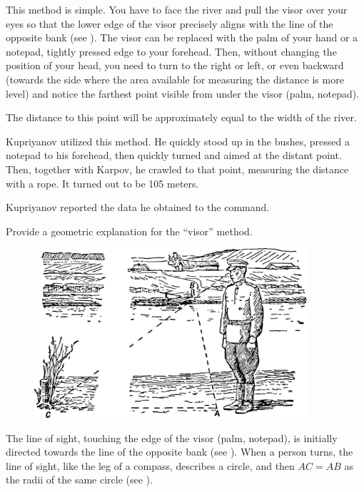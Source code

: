 This method is simple. You have to face the river and pull the visor over your eyes so that the lower edge of the visor precisely aligns with the line of the opposite bank (see ). The visor can be replaced with the palm of your hand or a notepad, tightly pressed edge to your forehead. Then, without changing the position of your head, you need to turn to the right or left, or even backward (towards the side where the area available for measuring the distance is more level) and notice the farthest point visible from under the visor (palm, notepad).

The distance to this point will be approximately equal to the width of the river.

Kupriyanov utilized this method. He quickly stood up in the bushes, pressed a notepad to his forehead, then quickly turned and aimed at the distant point. Then, together with Karpov, he crawled to that point, measuring the distance with a rope. It turned out to be 105 meters.

Kupriyanov reported the data he obtained to the command.

\ques Provide a geometric explanation for the ``visor'' method.

\begin{figure}[h!]
\centering
\includegraphics[width=0.9\textwidth]{figures/ch-02/fig-033.pdf}
\end{figure}

\ans The line of sight, touching the edge of the visor (palm, notepad), is initially directed towards the line of the opposite bank (see ). When a person turns, the line of sight, like the leg of a compass, describes a circle, and then $AC = AB$ as the radii of the same circle (see ). 

